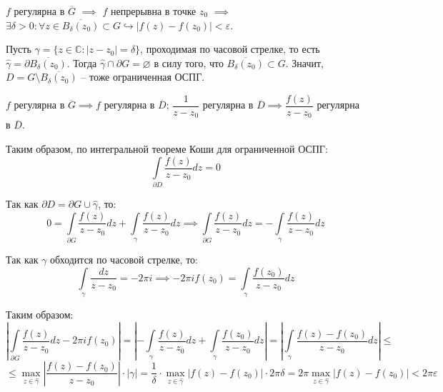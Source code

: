 \documentclass[12pt, a4paper, reqno]{article}
\begin{document}
    $f$ регулярна в $\overline{G}$ $\implies$ $f$ непрерывна в точке $z_0$ $\implies$
    $\exists \delta > 0: \forall z \in \overline{B_{\delta}(z_0)} \subset G \hookrightarrow
    |f(z) - f(z_0)| < \varepsilon$.

    Пусть $\gamma = \{z \in \mathbb{C} : |z - z_0| = \delta\}$, проходимая по часовой стрелке, то есть
    $\hat{\gamma} = \partial\overline{B_{\delta}(z_0)}$. Тогда
    $\hat{\gamma} \cap \partial G = \varnothing$ в силу того, что
    $\overline{B_{\delta}(z_0)} \subset G$. Значит, $D = G \setminus \overline{B_{\delta}(z_0)}$ --
    тоже ограниченная ОСПГ.

    $f$ регулярна в $\overline{G} \implies f$ регулярна в $\overline{D}$; $\dfrac{1}{z - z_0}$
    регулярна в $\overline{D} \implies \dfrac{f(z)}{z - z_0}$ регулярна в $\overline{D}$.

    Таким образом, по интегральной теореме Коши для ограниченной ОСПГ:
    \begin{equation*}
        \int\limits_{\partial D}\frac{f(z)}{z - z_0}dz = 0
    \end{equation*}

    Так как $\partial D = \partial G \cup \hat{\gamma}$, то:
    \begin{equation*}
        0 = \int\limits_{\partial G}\frac{f(z)}{z - z_0}dz + \int\limits_{\gamma}\frac{f(z)}{z - z_0}dz
        \implies \int\limits_{\partial G}\frac{f(z)}{z - z_0}dz = -\int\limits_{\gamma}\frac{f(z)}{z - z_0}dz
    \end{equation*}

    Так как $\gamma$ обходится по часовой стрелке, то:
    \begin{equation*}
        \int\limits_{\gamma}\frac{dz}{z - z_0} = -2\pi i \implies
        -2\pi i f(z_0) = \int\limits_{\gamma}\frac{f(z_0)}{z - z_0}dz
    \end{equation*}

    Таким образом:
    \begin{equation*}
        \left|\int\limits_{\partial G}\frac{f(z)}{z - z_0}dz - 2\pi i f(z_0)\right| =
        \left|-\int\limits_{\gamma}\frac{f(z)}{z - z_0}dz + \int\limits_{\gamma}\frac{f(z_0)}{z - z_0}dz\right| =
        \left|\int\limits_{\gamma}\frac{f(z) - f(z_0)}{z - z_0}dz\right| \leq
    \end{equation*}
    \begin{equation*}
        \leq \max\limits_{z \in \hat{\gamma}}\left|\frac{f(z) - f(z_0)}{z - z_0}\right| \cdot |\gamma| =
        \frac{1}{\delta} \cdot \max\limits_{z \in \hat{\gamma}} |f(z) - f(z_0)| \cdot 2\pi\delta =
        2\pi\max\limits_{z \in \hat{\gamma}} |f(z) - f(z_0)| < 2\pi\varepsilon
    \end{equation*}
\end{document}
